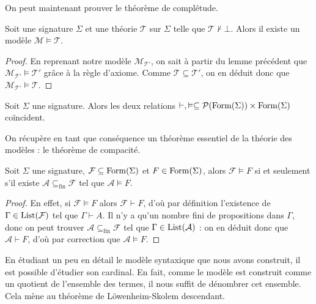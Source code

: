 On peut maintenant prouver le théorème de complétude.

\begin{theorem}
  Soit une signature $\Sigma$ et une théorie $\mathcal T$ sur $\Sigma$ telle que
  $\mathcal T\not\vdash\bot$. Alors il existe un modèle
  $\mathcal M\models \mathcal T$.
\end{theorem}

\begin{proof}
  En reprenant notre modèle $\mathcal M_{\mathcal T'}$, on sait à partir du lemme
  précédent que $\mathcal M_{\mathcal T'}\models \mathcal T'$ grâce à la règle
  d'axiome. Comme $\mathcal T\subseteq\mathcal T'$, on en déduit donc que
  $\mathcal M_{\mathcal T'}\models \mathcal T$.
\end{proof}

\begin{theorem}\label{thm.completude}
  Soit $\Sigma$ une signature. Alors les deux relations
  $\vdash,\vDash\subseteq \mathcal{P}(\operatorname{Form}(\Sigma))\times\operatorname{Form}(\Sigma)$
  coïncident.
\end{theorem}

On récupère en tant que conséquence un théorème essentiel de la théorie des
modèles : le théorème de compacité.

\begin{theorem}
  Soit $\Sigma$ une signature, $\mathcal F \subseteq\operatorname{Form}(\Sigma)$ et
  $F\in\operatorname{Form}(\Sigma)$, alors $\mathcal F\vDash F$ si et seulement s'il existe
  $\mathcal A\subseteq_{\mathrm{fin}} \mathcal F$ tel que
  $\mathcal A\vDash F$.
\end{theorem}

\begin{proof}
  En effet, si $\mathcal F\vDash F$ alors $\mathcal F\vdash F$, d'où par
  définition l'existence de $\Gamma\in\operatorname{List}(\mathcal F)$ tel que
  $\Gamma\vdash A$. Il n'y a qu'un nombre fini de propositions dans $\Gamma$,
  donc on peut trouver $\mathcal A\subseteq_{\mathrm{fin}}\mathcal F$ tel que
  $\Gamma\in\operatorname{List}(\mathcal A)$ : on en déduit donc que $\mathcal A\vdash F$,
  d'où par correction que $\mathcal A\vDash F$.
\end{proof}

En étudiant un peu en détail le modèle syntaxique que nous avons construit, il
est possible d'étudier son cardinal. En fait, comme le modèle est construit
comme un quotient de l'ensemble des termes, il nous suffit de dénombrer cet
ensemble. Cela mène au théorème de Löwenheim-Skolem descendant.

